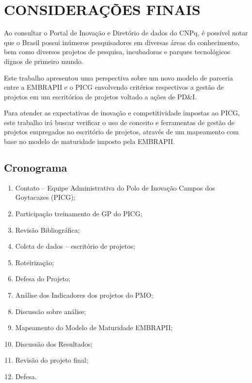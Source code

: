 \chapter{CONSIDERAÇÕES FINAIS}
\thispagestyle{empty}

Ao consultar o Portal de Inovação e Diretório de dados do CNPq, é possível notar que o Brasil possui inúmeros pesquisadores em diversas áreas do conhecimento, bem como diversos projetos de pesquisa, incubadoras e parques tecnológicos dignos de primeiro mundo.

Este trabalho apresentou uma perspectiva sobre um novo modelo de parceria entre a EMBRAPII e o PICG envolvendo critérios respectivos a gestão de projetos em um escritórioa de projetos voltado a ações de PD\&I.

Para atender as expectativas de inovação e competitividade impostas ao PICG, este trabalho irá buscar verificar o uso de conceito e ferramentas de gestão de projetos empregados no escritório de projetos, através de um mapeamento com base no modelo de maturidade imposto pela EMBRAPII.


\newpage
\thispagestyle{empty}
\singlespacing
\section{Cronograma}

\begin{enumerate}
  \item{Contato – Equipe Administrativa do Polo de Inovação Campos dos Goytacazes (PICG);}
  \item{Participação treinamento de GP do PICG;}
  \item{Revisão Bibliográfica;}
  \item{Coleta de dados – escritório de projetos;}
  \item{Roteirização;}
  \item{Defesa do Projeto;}
  \item{Análise dos Indicadores dos projetos do PMO;}
  \item{Discussão sobre análise;}
  \item{Mapeamento do Modelo de Maturidade EMBRAPII;}
  \item{Discussão dos Resultados;}
  \item{Revisão do projeto final;}
  \item{Defesa.}
\end{enumerate}


